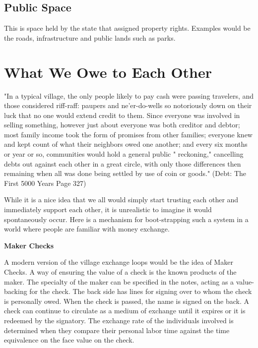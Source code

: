 \documentclass{article}
\begin{document}
\subsection{Public Space} This is space held by the state that assigned property rights. Examples would be the roads, infrastructure and public lands such as parks. 



\pagebreak
{\section{What We Owe to Each Other}}


	
\begin{minipage}[t]{0.72\textwidth}
	\vspace{0pt}
	"In a typical village, the only people likely to pay cash were passing
	travelers, and those considered riff-raff: paupers and ne'er-do-wells so
	notoriously down on their luck that no one would extend credit to
	them. Since everyone was involved in selling something, however just
	about everyone was both creditor and debtor; most family income took
	the form of promises from other families; everyone knew and kept
	count of what their neighbors owed one another; and every six months
	or year or so, communities would hold a general public " reckoning,"
	cancelling debts out against each other in a great circle, with only those
	differences then remaining when all was done being settled by use of
	coin or goods." (Debt: The First 5000 Years Page 327)
	
	\vspace{0.2cm}
	
	While it is a nice idea that we all would simply start trusting each other and immediately support each other, it is unrealistic to imagine it would spontaneously occur. Here is a mechanism for boot-strapping such a system in a world where people are familiar with money exchange. 
	
{\centering \textbf{Maker Checks}\par}
	
	A modern version of the village exchange loops would be the idea of Maker Checks. A way of ensuring the value of a check is the known products of the maker. The specialty of the maker can be specified in the notes, acting as a value-backing for the check. The back side has lines for signing over to whom the check is personally owed. When the check is passed, the name is signed on the back. A check can continue to circulate as a medium of exchange until it expires or it is redeemed by the signatory. The exchange rate of the individuals involved is determined when they compare their personal labor time against the time equivalence on the face value on the check.
	

\end{minipage}
\end{document}
